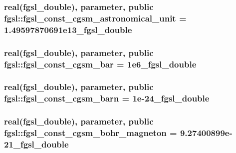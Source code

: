 \subsubsection[{fgsl\+\_\+const\+\_\+cgsm\+\_\+astronomical\+\_\+unit}]{\setlength{\rightskip}{0pt plus 5cm}real({\bf fgsl\+\_\+double}), parameter, public fgsl\+::fgsl\+\_\+const\+\_\+cgsm\+\_\+astronomical\+\_\+unit = 1.\+49597870691e13\+\_\+fgsl\+\_\+double}\label{namespacefgsl_af1dd23df42a3363f75423e5d3ff79cde}
\hypertarget{namespacefgsl_a324807e6ca282345460f8918fc39f07f}{}
\subsubsection[{fgsl\+\_\+const\+\_\+cgsm\+\_\+bar}]{\setlength{\rightskip}{0pt plus 5cm}real({\bf fgsl\+\_\+double}), parameter, public fgsl\+::fgsl\+\_\+const\+\_\+cgsm\+\_\+bar = 1e6\+\_\+fgsl\+\_\+double}\label{namespacefgsl_a324807e6ca282345460f8918fc39f07f}
\hypertarget{namespacefgsl_a96f3fd765f8469355c932e287e34f25a}{}
\subsubsection[{fgsl\+\_\+const\+\_\+cgsm\+\_\+barn}]{\setlength{\rightskip}{0pt plus 5cm}real({\bf fgsl\+\_\+double}), parameter, public fgsl\+::fgsl\+\_\+const\+\_\+cgsm\+\_\+barn = 1e-\/24\+\_\+fgsl\+\_\+double}\label{namespacefgsl_a96f3fd765f8469355c932e287e34f25a}
\hypertarget{namespacefgsl_a106f93e7068726bf01947287eb77faed}{}
\subsubsection[{fgsl\+\_\+const\+\_\+cgsm\+\_\+bohr\+\_\+magneton}]{\setlength{\rightskip}{0pt plus 5cm}real({\bf fgsl\+\_\+double}), parameter, public fgsl\+::fgsl\+\_\+const\+\_\+cgsm\+\_\+bohr\+\_\+magneton = 9.\+27400899e-\/21\+\_\+fgsl\+\_\+double}\label{namespacefgsl_a106f93e7068726bf01947287eb77faed}
\hypertarget{namespacefgsl_a61da4815b82a64d0b0a2a5737ee854f5}{}
